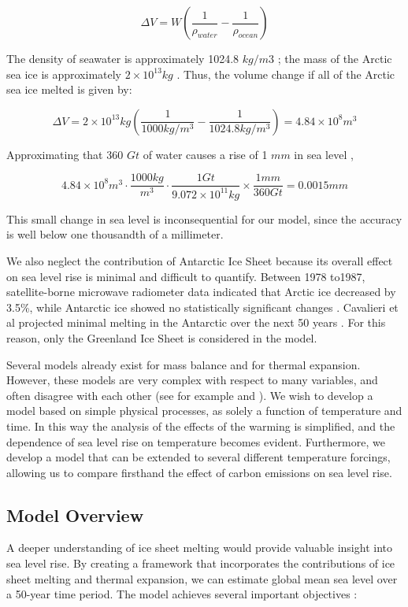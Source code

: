 \documentclass[12pt,a4paper,titlepage]{article}
\begin{document}
\[
\Delta V=W(\frac{1}{\rho_{water}}-\frac{1}{\rho_{ocean}})
\]

The density of seawater is approximately 1024.8 $kg/m3$ ; the mass
of the Arctic sea ice is approximately $2 \times 10^{13} kg$ .
Thus, the volume change if all of the Arctic sea ice melted is
given by:

\[
\Delta
V=2\times10^{13}kg(\frac{1}{1000kg/m^3}-\frac{1}{1024.8kg/m^3})=4.84\times10^8m^3
\]

Approximating that 360 $Gt$ of water causes a rise of 1 $mm$ in
sea level ,

\[
4.84\times10^8m^3\cdot\frac{1000kg}{m^3}\cdot\frac{1Gt}{9.072\times10^{11}kg}\times\frac{1mm}{360Gt}=0.0015mm
\]

This small change in sea level is inconsequential for our model,
since the accuracy is well below one thousandth of a millimeter.

We also neglect the contribution of Antarctic Ice Sheet because
its overall effect on sea level rise is minimal and difficult to
quantify. Between 1978 to1987, satellite-borne microwave
radiometer data indicated that Arctic ice decreased by 3.5\%,
while Antarctic ice showed no statistically significant changes .
Cavalieri et al projected minimal melting in the Antarctic over
the next 50 years . For this reason, only the Greenland Ice Sheet
is considered in the model.

Several models already exist for mass balance and for thermal
expansion. However, these models are very complex with respect to
many variables, and often disagree with each other (see for
example and ). We wish to develop a model based on simple physical
processes, as solely a function of temperature and time. In this
way the analysis of the effects of the warming is simplified, and
the dependence of sea level rise on temperature becomes evident.
Furthermore, we develop a model that can be extended to several
different temperature forcings, allowing us to compare firsthand
the effect of carbon emissions on sea level rise.

\subsection{Model Overview}

A deeper understanding of ice sheet melting would provide valuable
insight into sea level rise. By creating a framework that
incorporates the contributions of ice sheet melting and thermal
expansion, we can estimate global mean sea level over a 50-year
time period. The model achieves several important objectives :
\end{document}

